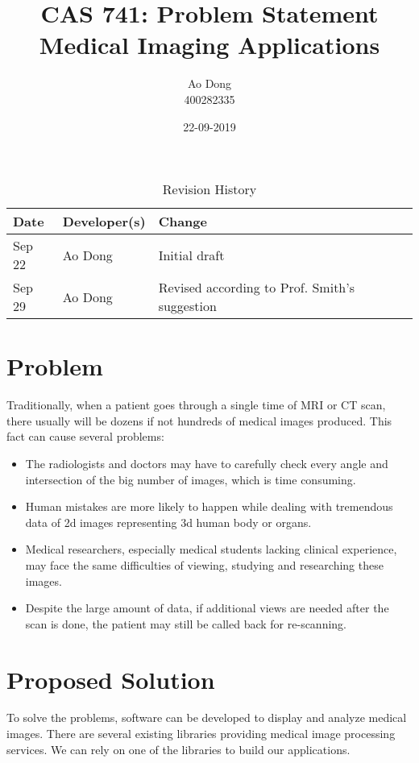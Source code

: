 \documentclass{article}
\title{CAS 741: Problem Statement\\Medical Imaging Applications}
\author{Ao Dong\\400282335}
\date{22-09-2019}
\begin{document}
\maketitle

\begin{table}[hp]
\caption{Revision History} \label{TblRevisionHistory}
\begin{tabularx}{\textwidth}{llX}
\toprule
\textbf{Date} & \textbf{Developer(s)} & \textbf{Change}\\
\midrule
Sep 22 & Ao Dong & Initial draft\\
Sep 29 & Ao Dong & Revised according to Prof. Smith's suggestion\\
\bottomrule
\end{tabularx}
\end{table}

\section*{Problem}
Traditionally, when a patient goes through a single time of MRI or CT scan, there usually will be dozens if not hundreds of medical images produced. This fact can cause several problems:

\begin{itemize}
\item The radiologists and doctors may have to carefully check every angle and intersection of the big number of images, which is time consuming.
\item Human mistakes are more likely to happen while dealing with tremendous data of 2d images representing 3d human body or organs.
\item Medical researchers, especially medical students lacking clinical experience, may face the same difficulties of viewing, studying and researching these images.
\item Despite the large amount of data, if additional views are needed after the scan is done, the patient may still be called back for re-scanning.
\end{itemize}

\section*{Proposed Solution}
To solve the problems, software can be developed to display and analyze medical images. There are several existing libraries providing medical image processing services. We can rely on one of the libraries to build our applications.
\end{document}
